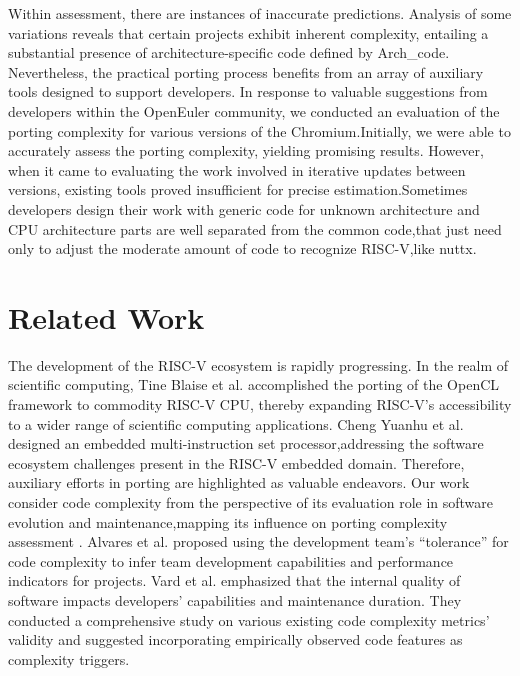 \documentclass[sigconf,screen,review,anonymous]{acmart}
\begin{document}
Within assessment, there are instances of inaccurate predictions. Analysis of some variations reveals that certain projects exhibit inherent complexity, entailing a substantial presence of architecture-specific code defined by Arch\_code.
Nevertheless, the practical porting process benefits from an array of auxiliary tools designed to support developers. In response to valuable suggestions from developers within the OpenEuler community, we conducted an evaluation of the porting complexity for various versions of the Chromium.Initially, we were able to accurately assess the porting complexity, yielding promising results. However, when it came to evaluating the work involved in iterative updates between versions, existing tools proved insufficient for precise estimation.Sometimes developers design their work with generic code for unknown architecture and CPU architecture parts are well separated from the common code,that just need only to adjust the moderate amount of code to recognize RISC-V,like nuttx.
\section{Related Work}
The development of the RISC-V ecosystem is rapidly progressing.
In the realm of scientific computing, Tine Blaise et al. \cite{osti_1830102} accomplished the porting of the OpenCL framework to commodity RISC-V CPU, thereby expanding RISC-V's accessibility to a wider range of scientific computing applications.
Cheng Yuanhu et al. \cite{2017Slow} designed an embedded multi-instruction set processor,addressing the software ecosystem challenges present in the RISC-V embedded domain.
Therefore, auxiliary efforts in porting are highlighted as valuable endeavors.
Our work consider code complexity from the perspective of its evaluation role in software evolution and maintenance,mapping its influence on porting complexity assessment \cite{1993Software}.
Alvares et al. \cite{7844689} proposed using the development team's ``tolerance'' for code complexity to infer team development capabilities and performance indicators for projects.
Vard et al. \cite{2017Evaluating} emphasized that the internal quality of software impacts developers' capabilities and maintenance duration.
They conducted a comprehensive study on various existing code complexity metrics' validity and suggested incorporating empirically observed code features as complexity triggers.
\end{document}
